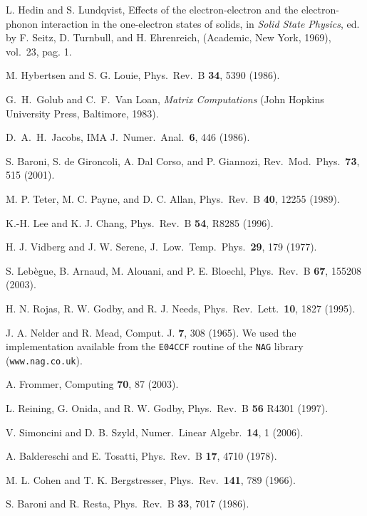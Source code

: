 \documentclass[twocolumn,prb,showpacs,superscriptaddress]{revtex4}
\begin{document}
\begin{thebibliography}{99}

L. Hedin and S. Lundqvist,
Effects of the electron-electron and the electron-phonon interaction in
the one-electron states of solids,
in {\it Solid State Physics}, ed. by F. Seitz, D. Turnbull, and
H. Ehrenreich, (Academic, New York, 1969), vol.\ 23, pag. 1.

M. Hybertsen and S. G. Louie, 
Phys.\ Rev.\ B {\bf 34}, 5390 (1986).

G.\ H.\ Golub and C.\ F.\ Van Loan, {\it Matrix Computations} (John Hopkins University Press, Baltimore, 1983).

D.\ A.\ H.\ Jacobs,
IMA J.\ Numer.\ Anal.\ {\bf 6}, 446 (1986).

S. Baroni, S. de Gironcoli, A. Dal Corso, and P. Giannozi, 
Rev.\ Mod.\ Phys.\ {\bf 73}, 515 (2001).

M. P. Teter, M. C. Payne, and D. C. Allan,
Phys.\ Rev.\ B {\bf 40}, 12255 (1989).

K.-H. Lee and K. J. Chang,
Phys.\ Rev.\ B {\bf 54}, R8285 (1996).

H. J. Vidberg and J. W. Serene,
J.\ Low.\ Temp.\ Phys.\ {\bf 29}, 179 (1977).

S. Leb\`egue, B. Arnaud, M. Alouani, and P. E. Bloechl,
Phys.\ Rev.\ B {\bf 67}, 155208 (2003).

H. N. Rojas, R. W. Godby, and R. J. Needs,
Phys.\ Rev.\ Lett.\ {\bf 10}, 1827 (1995).

J. A. Nelder and R. Mead, 
Comput. J. {\bf 7}, 308 (1965).
We used the implementation available from the
{\tt E04CCF} routine of the {\tt NAG} library
({\tt www.nag.co.uk}).

A. Frommer,
Computing {\bf 70}, 87 (2003).

L. Reining, G. Onida, and R. W. Godby, 
Phys.\ Rev.\ B {\bf 56} R4301 (1997).

V. Simoncini and D. B. Szyld,
Numer.\ Linear Algebr.\ {\bf 14}, 1 (2006).

A. Baldereschi and E. Tosatti,
Phys.\ Rev.\ B {\bf 17}, 4710 (1978).

M. L. Cohen and T. K. Bergstresser,
Phys.\ Rev.\ {\bf 141}, 789 (1966).

S. Baroni and R. Resta,
Phys.\ Rev.\ B {\bf 33}, 7017 (1986).


\end{thebibliography}
\end{document}
